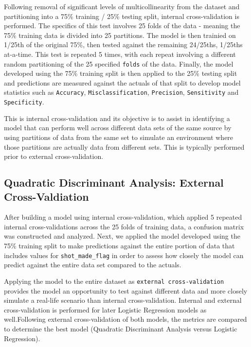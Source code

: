 \documentclass[american,]{article}
\begin{document}
Following removal of significant levels of multicollinearity from the dataset and partitioning into a 75\% training / 25\% testing split, internal cross-validation is performed. The specifics of this test involves 25 folds of the data - meaning the 75\% training data is divided into 25 partitions. The model is then trainied on 1/25th of the original 75\%, then tested against the remaining 24/25ths, 1/25ths at-a-time. This test is repeated 5 times, with each repeat involving a different random partitioning of the 25 specified \texttt{folds} of the data. Finally, the model developed using the 75\% training split is then applied to the 25\% testing split and predictions are measured against the actuals of that split to develop model statistics such as \texttt{Accuracy}, \texttt{Misclassification}, \texttt{Precision}, \texttt{Sensitivity} and \texttt{Specificity}.

This is internal cross-validation and its objective is to assist in identifying a model that can perform well across different data sets of the same source by using partitions of data from the same set to simulate an environment where those partitions are actually data from different sets. This is typically performed prior to external cross-validation.

\hypertarget{quadratic-discriminant-analysis-external-cross-valdiation}{%
\subsection{\texorpdfstring{\textbf{Quadratic Discriminant Analysis: External Cross-Valdiation}}{Quadratic Discriminant Analysis: External Cross-Valdiation}}\label{quadratic-discriminant-analysis-external-cross-valdiation}}

After building a model using internal cross-validation, which applied 5 repeated internal cross-validations across the 25 folds of training data, a confusion matrix was constructed and analyzed. Next, we applied the model developed using the 75\% training split to make predictions against the entire portion of data that includes values for \texttt{shot\_made\_flag} in order to assess how closely the model can predict against the entire data set compared to the actuals.

Applying the model to the entire dataset as \texttt{external\ cross-validation} provides the model an opportunity to test against different data and more closely simulate a real-life scenario than internal cross-validation. Internal and external cross-validation is performed for later Logistic Regression models as well.Following external cross-validation of both models, the metrics are compared to determine the best model (Quadratic Discriminant Analysis versus Logistic Regression).
\end{document}
